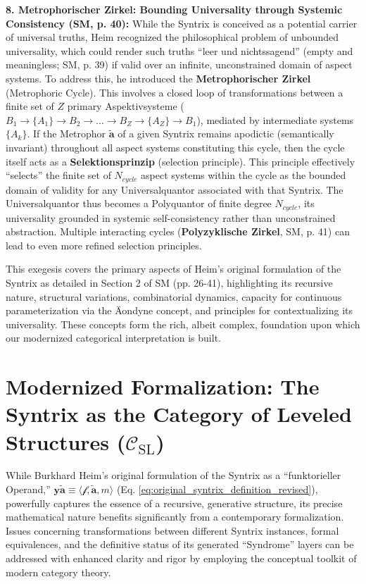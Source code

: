 \documentclass[
    12pt,              %
    a4paper,           %
    headings=normal,   %
    twoside=true,      %
    BCOR=8mm,          %
]{scrbook}
\newcommand{\q}[1]{\enquote{#1}}
\newcommand{\syntrix}{\bm{y\widetilde{a}}}
\newcommand{\metrophor}{\bm{\widetilde{a}}}
\newcommand{\synkolator}{\mathcal{f}}
\newcommand{\synkolationsstufe}{m}
\begin{document}
\textbf{8. Metrophorischer Zirkel: Bounding Universality through Systemic Consistency (SM, p. 40):}
While the Syntrix is conceived as a potential carrier of universal truths, Heim recognized the philosophical problem of unbounded universality, which could render such truths \q{leer und nichtssagend} (empty and meaningless; SM, p. 39) if valid over an infinite, unconstrained domain of aspect systems. To address this, he introduced the \textbf{Metrophorischer Zirkel} (Metrophoric Cycle). This involves a closed loop of transformations between a finite set of \(Z\) primary Aspektivsysteme (\(B_1 \to \{A_1\} \to B_2 \to \dots \to B_Z \to \{A_Z\} \to B_1\)), mediated by intermediate systems \(\{A_k\}\). If the Metrophor \(\metrophor\) of a given Syntrix remains apodictic (semantically invariant) throughout all aspect systems constituting this cycle, then the cycle itself acts as a \textbf{Selektionsprinzip} (selection principle). This principle effectively \q{selects} the finite set of \(N_{cycle}\) aspect systems within the cycle as the bounded domain of validity for any Universalquantor associated with that Syntrix. The Universalquantor thus becomes a Polyquantor of finite degree \(N_{cycle}\), its universality grounded in systemic self-consistency rather than unconstrained abstraction. Multiple interacting cycles (\textbf{Polyzyklische Zirkel}, SM, p. 41) can lead to even more refined selection principles.

This exegesis covers the primary aspects of Heim's original formulation of the Syntrix as detailed in Section 2 of SM (pp. 26-41), highlighting its recursive nature, structural variations, combinatorial dynamics, capacity for continuous parameterization via the Äondyne concept, and principles for contextualizing its universality. These concepts form the rich, albeit complex, foundation upon which our modernized categorical interpretation is built.

\section{Modernized Formalization: The Syntrix as the Category of Leveled Structures (\(\mathcal{C}_{\text{SL}}\))}
\label{sec:ch2_modernized_syntrix_category} 

While Burkhard Heim’s original formulation of the Syntrix as a \q{funktorieller Operand,} \(\syntrix \equiv \langle \synkolator, \metrophor, \synkolationsstufe \rangle\) (Eq. \eqref{eq:original_syntrix_definition_revised}), powerfully captures the essence of a recursive, generative structure, its precise mathematical nature benefits significantly from a contemporary formalization. Issues concerning transformations between different Syntrix instances, formal equivalences, and the definitive status of its generated \q{Syndrome} layers can be addressed with enhanced clarity and rigor by employing the conceptual toolkit of modern category theory.
\end{document}
